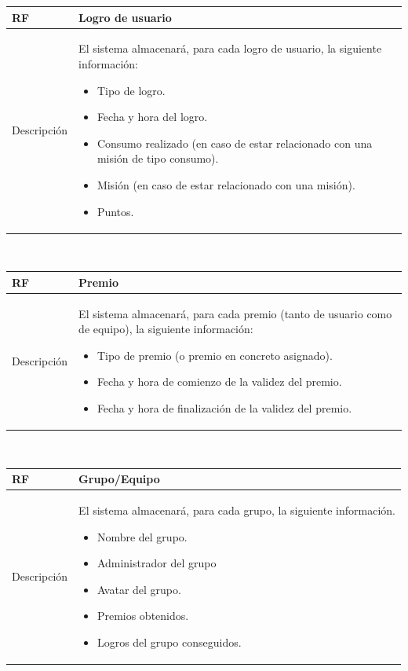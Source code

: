 \documentclass[twoside]{report}
\newcommand\addrow[2]{#1 &#2\\ }
\newcommand\addheading[2]{#1 &#2\\ \hline}
\newcommand\tabularhead{\begin{tabular}{lp{0.7\textwidth}}
\hline
}
\newenvironment{req}{\tabularhead}
{\hline\end{tabular}}
\begin{document}
\vspace{0.25cm}

\begin{req}
	\addheading{\textbf{RF\arabic{functionalRequirements}}}{Logro de usuario}
	\addrow{Descripción}{
	El sistema almacenará, para cada logro de usuario, la siguiente información:
	\begin{itemize}
		\item Tipo de logro.
		\item Fecha y hora del logro.
		\item Consumo realizado (en caso de estar relacionado con una misión de tipo consumo).
		\item Misión (en caso de estar relacionado con una misión).
		\item Puntos.
	\end{itemize}
	}
\end{req}\\

\vspace{0.25cm}

\begin{req}
	\addheading{\textbf{RF\arabic{functionalRequirements}}}{Premio}
	\addrow{Descripción}{
	El sistema almacenará, para cada premio (tanto de usuario como de equipo), la siguiente información:
	\begin{itemize}
		\item Tipo de premio (o premio en concreto asignado).
		\item Fecha y hora de comienzo de la validez del premio.
		\item Fecha y hora de finalización de la validez del premio.
	\end{itemize}
	}
\end{req}\\

\vspace{0.25cm}

\begin{req}
	\addheading{\textbf{RF\arabic{functionalRequirements}}}{Grupo/Equipo}
	\addrow{Descripción}{
	El sistema almacenará, para cada grupo, la siguiente información.
	\begin{multicols}{2}
	\begin{itemize}
		\item Nombre del grupo.
		\item Administrador del grupo
		\item Avatar del grupo.
		\item Premios obtenidos.
		\item Logros del grupo conseguidos.
	\end{itemize}
	\end{multicols}
	}
\end{req}\\
\end{document}
